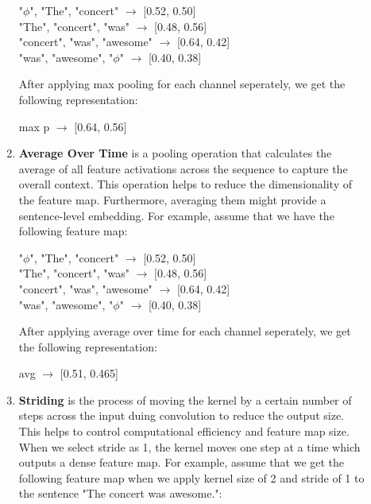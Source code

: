 \documentclass[10pt]{article}
\begin{document}
\begin{description}
\begin{enumerate}
        \begin{center}
            "$\phi$", "The", "concert" $\rightarrow$ [0.52, 0.50] \\
            "The", "concert", "was" $\rightarrow$ [0.48, 0.56] \\
            "concert", "was", "awesome" $\rightarrow$ [0.64, 0.42] \\
            "was", "awesome", "$\phi$" $\rightarrow$ [0.40, 0.38]
        \end{center}

        After applying max pooling for each channel seperately, we get the following representation:

        \begin{center}
            max p $\rightarrow$ [0.64, 0.56] \\
        \end{center}

        \item \textbf{Average Over Time} is a pooling operation that calculates the average of all feature activations across the sequence to capture the overall context.
        This operation helps to reduce the dimensionality of the feature map. Furthermore, averaging them might provide a sentence-level embedding.
        For example, assume that we have the following feature map:

        \begin{center}
            "$\phi$", "The", "concert" $\rightarrow$ [0.52, 0.50] \\
            "The", "concert", "was" $\rightarrow$ [0.48, 0.56] \\
            "concert", "was", "awesome" $\rightarrow$ [0.64, 0.42] \\
            "was", "awesome", "$\phi$" $\rightarrow$ [0.40, 0.38]
        \end{center}

        After applying average over time for each channel seperately, we get the following representation:

        \begin{center}
            avg $\rightarrow$ [0.51, 0.465] \\
        \end{center}

        \item \textbf{Striding} is the process of moving the kernel by a certain number of steps across the input duing convolution to reduce the output size.
        This helps to control computational efficiency and feature map size. When we select stride as 1, the kernel moves one step at a time which outputs a dense feature map.
        For example, assume that we get the following feature map when we apply kernel size of 2 and stride of 1 to the sentence "The concert was awesome.":


\end{enumerate}
\end{description}
\end{document}

